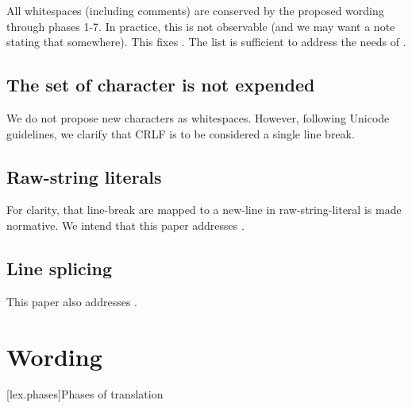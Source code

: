 \documentclass{wg21}
\begin{document}
All whitespaces (including comments) are conserved by the proposed wording through phases 1-7.
In practice, this is not observable (and we may want a note stating that somewhere).
This fixes . The list is sufficient to address the needs of .

\subsection{The set of character is not expended}

We do not propose new characters as whitespaces. 
However, following Unicode guidelines, we clarify that CRLF is to be considered a single line break.

\subsection{Raw-string literals}

For clarity, that line-break are mapped to a new-line in raw-string-literal is made normative.
We intend that this paper addresses .

\subsection{Line splicing}

This paper also addresses .

\section{Wording}
[lex.phases]{Phases of translation}%
\end{document}
